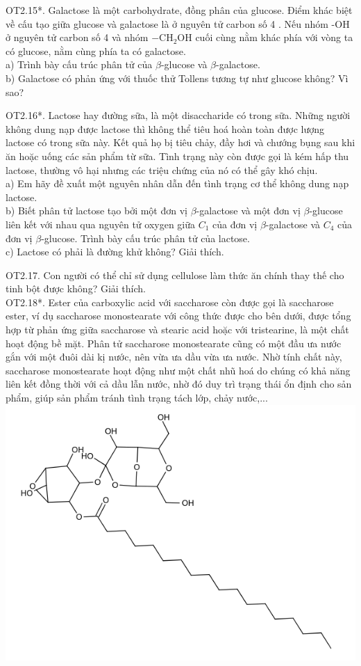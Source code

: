 \documentclass[10pt]{article}
\begin{document}
OT2.15*. Galactose là một carbohydrate, đồng phân của glucose. Điểm khác biệt về cấu tạo giữa glucose và galactose là ở nguyên tử carbon số 4 . Nếu nhóm -OH ở nguyên tử carbon số 4 và nhóm $-\mathrm{CH}_{2} \mathrm{OH}$ cuối cùng nằm khác phía với vòng ta có glucose, nằm cùng phía ta có galactose.\\
a) Trình bày cấu trúc phân tử của $\beta$-glucose và $\beta$-galactose.\\
b) Galactose có phản ứng với thuốc thử Tollens tương tự như glucose không? Vì sao?

OT2.16*. Lactose hay đường sữa, là một disaccharide có trong sữa. Những người không dung nạp được lactose thì không thể tiêu hoá hoàn toàn được lượng lactose có trong sữa này. Kết quả họ bị tiêu chảy, đầy hơi và chướng bụng sau khi ăn hoặc uống các sản phẩm từ sữa. Tình trạng này còn được gọi là kém hấp thu lactose, thường vô hại nhưng các triệu chứng của nó có thể gây khó chịu.\\
a) Em hãy đề xuất một nguyên nhân dẫn đến tình trạng cơ thể không dung nạp lactose.\\
b) Biết phân tử lactose tạo bởi một đơn vị $\beta$-galactose và một đơn vị $\beta$-glucose liên kết với nhau qua nguyên tử oxygen giữa $C_{1}$ của đơn vị $\beta$-galactose và $C_{4}$ của đơn vị $\beta$-glucose. Trình bày cấu trúc phân tử của lactose.\\
c) Lactose có phải là đường khử không? Giải thích.

OT2.17. Con người có thể chỉ sử dụng cellulose làm thức ăn chính thay thế cho tinh bột được không? Giải thích.\\
OT2.18*. Ester của carboxylic acid với saccharose còn được gọi là saccharose ester, ví dụ saccharose monostearate với công thức được cho bên dưới, được tổng hợp từ phản ứng giữa saccharose và stearic acid hoặc với tristearine, là một chất hoạt động bề mặt. Phân tử saccharose monostearate cũng có một đầu ưa nước gắn với một đuôi dài kị nước, nên vừa ưa dầu vừa ưa nước. Nhờ tính chất này, saccharose monostearate hoạt động như một chất nhũ hoá do chúng có khả năng liên kết đồng thời với cả dầu lẫn nước, nhờ đó duy trì trạng thái ổn định cho sản phẩm, giúp sản phẩm tránh tình trạng tách lớp, chảy nước,...\\
\includegraphics{smile-9255d6c331f26a80d43cebac72e25d16b5ba88ae}
\end{document}
